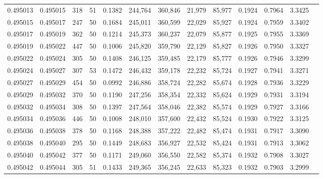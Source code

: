\begin{tabular}{rrrrrrrrrrrrr}
0.495013 & 0.495015 &   318 &  51 &                                     0.1382 & 244,764 & 360,846 &  21,979 &  85,977 & 0.1924 & 0.7964 & 3.3425 \\
0.495015 & 0.495017 &   247 &  50 &                                     0.1684 & 245,011 & 360,599 &  22,029 &  85,927 & 0.1924 & 0.7959 & 3.3402 \\
0.495017 & 0.495019 &   362 &  50 &                                     0.1214 & 245,373 & 360,237 &  22,079 &  85,877 & 0.1925 & 0.7955 & 3.3369 \\
0.495019 & 0.495022 &   447 &  50 &                                     0.1006 & 245,820 & 359,790 &  22,129 &  85,827 & 0.1926 & 0.7950 & 3.3327 \\
0.495022 & 0.495024 &   305 &  50 &                                     0.1408 & 246,125 & 359,485 &  22,179 &  85,777 & 0.1926 & 0.7946 & 3.3299 \\
0.495024 & 0.495027 &   307 &  53 &                                     0.1472 & 246,432 & 359,178 &  22,232 &  85,724 & 0.1927 & 0.7941 & 3.3271 \\
0.495027 & 0.495029 &   454 &  50 &                                     0.0992 & 246,886 & 358,724 &  22,282 &  85,674 & 0.1928 & 0.7936 & 3.3229 \\
0.495029 & 0.495032 &   370 &  50 &                                     0.1190 & 247,256 & 358,354 &  22,332 &  85,624 & 0.1929 & 0.7931 & 3.3194 \\
0.495032 & 0.495034 &   308 &  50 &                                     0.1397 & 247,564 & 358,046 &  22,382 &  85,574 & 0.1929 & 0.7927 & 3.3166 \\
0.495034 & 0.495036 &   446 &  50 &                                     0.1008 & 248,010 & 357,600 &  22,432 &  85,524 & 0.1930 & 0.7922 & 3.3125 \\
0.495036 & 0.495038 &   378 &  50 &                                     0.1168 & 248,388 & 357,222 &  22,482 &  85,474 & 0.1931 & 0.7917 & 3.3090 \\
0.495038 & 0.495040 &   295 &  50 &                                     0.1449 & 248,683 & 356,927 &  22,532 &  85,424 & 0.1931 & 0.7913 & 3.3062 \\
0.495040 & 0.495042 &   377 &  50 &                                     0.1171 & 249,060 & 356,550 &  22,582 &  85,374 & 0.1932 & 0.7908 & 3.3027 \\
0.495042 & 0.495044 &   305 &  51 &                                     0.1433 & 249,365 & 356,245 &  22,633 &  85,323 & 0.1932 & 0.7903 & 3.2999 \\

\end{tabular}
